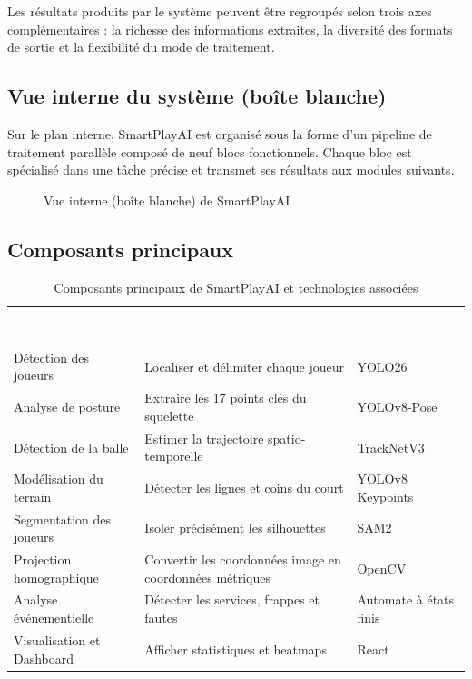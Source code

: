 Les résultats produits par le système peuvent être regroupés selon trois axes complémentaires : la richesse des informations extraites, la diversité des formats de sortie et la flexibilité du mode de traitement.

\subsection{Vue interne du système (boîte blanche)}

Sur le plan interne, SmartPlayAI est organisé sous la forme d’un pipeline de traitement parallèle composé de neuf blocs fonctionnels. Chaque bloc est spécialisé dans une tâche précise et transmet ses résultats aux modules suivants.

\begin{figure}[H]
    \centering
    \caption{Vue interne (boîte blanche) de SmartPlayAI}
    \label{fig:whitebox-smartplayai}
\end{figure}

\subsection{Composants principaux}

\begin{table}[H]
  \centering
  \renewcommand{\arraystretch}{1.3}
  \begin{tabularx}{\textwidth}{L{3.5cm} X C{3.5cm}}
    \textcolor{white}{\textbf{Composant}} &
    \textcolor{white}{\textbf{Rôle fonctionnel}} &
    \textcolor{white}{\textbf{Technologie retenue}} \\
    Détection des joueurs & Localiser et délimiter chaque joueur & YOLO26 \\
    Analyse de posture & Extraire les 17 points clés du squelette & YOLOv8-Pose \\
    Détection de la balle & Estimer la trajectoire spatio-temporelle & TrackNetV3 \\
    Modélisation du terrain & Détecter les lignes et coins du court & YOLOv8 Keypoints \\
    Segmentation des joueurs & Isoler précisément les silhouettes & SAM2 \\
    Projection homographique & Convertir les coordonnées image en coordonnées métriques & OpenCV \\
    Analyse événementielle & Détecter les services, frappes et fautes & Automate à états finis \\
    Visualisation et Dashboard & Afficher statistiques et heatmaps & React \\
  \end{tabularx}
  \caption{Composants principaux de SmartPlayAI et technologies associées}
  \label{tab:components-smartplayai}
\end{table}

